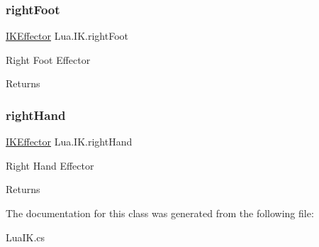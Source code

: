 \subsubsection{\texorpdfstring{rightFoot}{rightFoot}}
{\footnotesize\ttfamily \mbox{\hyperlink{class_lua_1_1_i_k_effector}{I\+K\+Effector}} Lua.\+I\+K.\+right\+Foot\hspace{0.3cm}{\ttfamily [get]}}



Right Foot Effector 

\begin{DoxyReturn}{Returns}

\end{DoxyReturn}
\mbox{\label{class_lua_1_1_i_k_a1321851e538f60beb7fa5d655e18ab75}} 
\subsubsection{\texorpdfstring{rightHand}{rightHand}}
{\footnotesize\ttfamily \mbox{\hyperlink{class_lua_1_1_i_k_effector}{I\+K\+Effector}} Lua.\+I\+K.\+right\+Hand\hspace{0.3cm}{\ttfamily [get]}}



Right Hand Effector 

\begin{DoxyReturn}{Returns}

\end{DoxyReturn}


The documentation for this class was generated from the following file\+:\begin{DoxyCompactItemize}
\item 
Lua\+I\+K.\+cs\end{DoxyCompactItemize}
